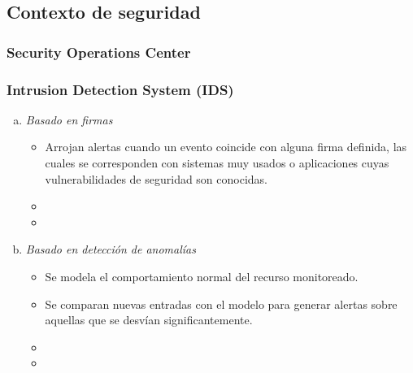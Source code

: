 \subsection{Contexto de seguridad}
\watermarkoff
\begin{frame}[t,fragile]
	\frametitle {Security Operations Center}
	
\end{frame}
\watermarkon
\watermarkoff
\begin{frame}[t,fragile]
	\frametitle {Intrusion Detection System (IDS)}
	
	
		\begin{enumerate}[a)]
			\item \textit{Basado en firmas}
			
			\begin{itemize}
				\item Arrojan alertas cuando un evento coincide con alguna firma definida, las cuales se corresponden con sistemas muy usados o aplicaciones cuyas vulnerabilidades de seguridad son conocidas.
				
				\pause
				\item \color{darkgreen}{Previsibilidad y gran precisión.}
				
				\item \color{red}{Fallan en identificar incidentes sin una firma disponible.} %
				
			\end{itemize}
			
			\pause
			\item \textit{Basado en detección de anomalías}
			
			\begin{itemize}
				\item Se modela el comportamiento normal del recurso monitoreado.
				\item Se comparan nuevas entradas con el modelo para generar alertas sobre aquellas que se desvían significantemente. %
				
				\pause
				\item \color{darkgreen}{Potencial para descubrir nuevos patrones de ataques.}
				\item \color{red}{Definición de entradas normales y anómalas.}
								
			\end{itemize}
			
		\end{enumerate}
	
	
\end{frame}
\watermarkon

